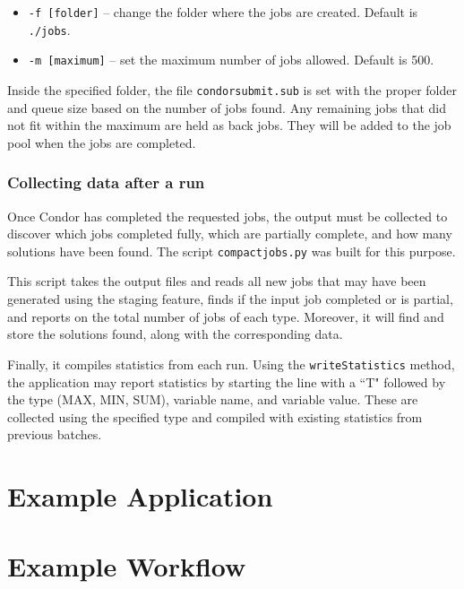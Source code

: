 \documentclass[11pt]{article}
\begin{document}
\begin{itemize}
	\item \texttt{-f [folder]} -- change the folder where the jobs are created.  Default is \texttt{./jobs}.
	\item \texttt{-m [maximum]} -- set the maximum number of jobs allowed.  Default is 500.
\end{itemize}

Inside the specified folder, the file \texttt{condorsubmit.sub} is set with
	the proper folder and queue size based on the number of jobs found.
Any remaining jobs that did not fit within the maximum are held as back jobs.
They will be added to the job pool when the jobs are completed.

\subsubsection{Collecting data after a run}

Once Condor has completed the requested jobs, the output must be collected to 
	discover which jobs completed fully, which are partially complete,
	and how many solutions have been found.
The script \texttt{compactjobs.py} was built for this purpose.

This script takes the output files and reads all new jobs that may have been generated 
	using the staging feature, finds if the input job completed or is partial,
	and reports on the total number of jobs of each type.
Moreover, it will find and store the solutions found, along with the corresponding data.

Finally, it compiles statistics from each run.  
Using the \texttt{writeStatistics} method,
	the application may report statistics by starting the line with a ``T" followed by the
	type (MAX, MIN, SUM), variable name, and variable value.
These are collected using the specified type and compiled with existing statistics from previous batches.






\section{Example Application}
\label{sec:Example}



\section{Example Workflow}
\label{sec:workflow}
\end{document}
